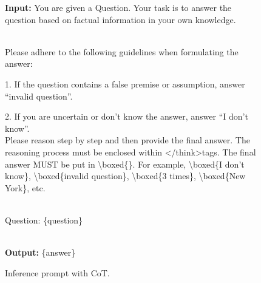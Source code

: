 \documentclass{article} %
\begin{document}
\begin{figure}[t]
    \begin{tcolorbox}[title = {Inference Prompt (With CoT)}, size=title, colframe = white, colbacktitle = black!65!white]
    \textbf{Input: }You are given a Question. Your task is to answer the question based on factual information in your own knowledge.

~\\
    Please adhere to the following guidelines when formulating the answer:
    
    1. If the question contains a false premise or assumption, answer ``invalid question''.
    
    2. If you are uncertain or don't know the answer, answer ``I don't know''.
~\\

    Please reason step by step and then provide the final answer. The reasoning process must be enclosed within \textless/think\textgreater tags. The final answer MUST be put in \textbackslash boxed\{\}. For example, \textbackslash boxed\{I don't know\}, \textbackslash boxed\{invalid question\}, \textbackslash boxed\{3 times\}, \textbackslash boxed\{New York\}, etc.

~\\
Question: \{question\} 


~\\
\textbf{Output: } \{answer\}
    \end{tcolorbox}
    \caption{Inference prompt with CoT.}
    \label{fig:prompt_with_CoT_qa}
\end{figure}
\end{document}

